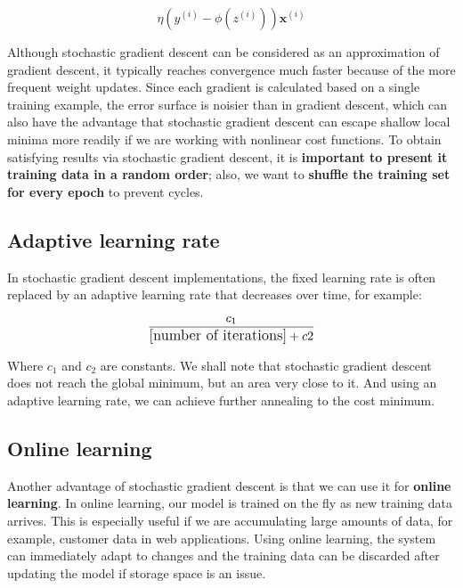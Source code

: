 \documentclass[11pt]{article}
\newcommand{\vect}[1]{\boldsymbol{#1}}
\begin{document}
    \begin{equation}
        \eta \left( y^{(i)} - \phi \left( z^{(i)} \right) \right) \vect{x}^{(i)}
    \end{equation}

    Although stochastic gradient descent can be considered as an approximation of gradient descent, it typically reaches convergence much faster because of the more frequent weight updates.
    Since each gradient is calculated based on a single training example, the error surface is noisier than in gradient descent, which can also have the advantage that stochastic gradient descent can escape shallow local minima more readily if we are working with nonlinear cost functions.
    To obtain satisfying results via stochastic gradient descent, it is \textbf{important to present it training data in a random order}; also, we want to \textbf{shuffle the training set for every epoch} to prevent cycles.

    \subsection{Adaptive learning rate} \label{subsec:ada_sgd_adl}

    In stochastic gradient descent implementations, the fixed learning rate is often replaced by an adaptive learning rate that decreases over time, for example:

    \begin{equation}
        \label{eq:ada_sgd_adl}
        \large{ \frac{c_1} {\text{[number of iterations]} + c2 } }
    \end{equation}

    Where $c_1$ and $c_2$ are constants.
    We shall note that stochastic gradient descent does not reach the global minimum, but an area very close to it.
    And using an adaptive learning rate, we can achieve further annealing to the cost minimum.

    \subsection{Online learning} \label{subsec:ada_sgd_online}

    Another advantage of stochastic gradient descent is that we can use it for \textbf{online learning}.
    In online learning, our model is trained on the fly as new training data arrives.
    This is especially useful if we are accumulating large amounts of data, for example, customer data in web applications.
    Using online learning, the system can immediately adapt to changes and the training data can be discarded after updating the model if storage space is an issue.
\end{document}
